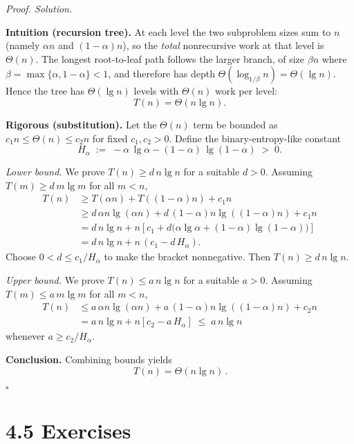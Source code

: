 \documentclass[12pt]{article}
\theoremstyle{definition}
\begin{document}
\medskip
\noindent\textit{Proof. Solution.}

\noindent\textbf{Intuition (recursion tree).}
At each level the two subproblem sizes sum to $n$ (namely $\alpha n$ and $(1-\alpha)n$),
so the \emph{total} nonrecursive work at that level is $\Theta(n)$.
The longest root-to-leaf path follows the larger branch, of size
$\beta n$ where $\beta=\max\{\alpha,1-\alpha\}<1$, and therefore has depth
$\Theta(\log_{1/\beta} n)=\Theta(\lg n)$. 
Hence the tree has $\Theta(\lg n)$ levels with $\Theta(n)$ work per level:
\[
T(n)=\Theta(n\lg n).
\]

\noindent\textbf{Rigorous (substitution).}
Let the $\Theta(n)$ term be bounded as $c_1 n\le \Theta(n)\le c_2 n$ for fixed $c_1,c_2>0$.
Define the binary-entropy-like constant
\[
H_\alpha \;:=\; -\alpha\,\lg \alpha - (1-\alpha)\,\lg(1-\alpha)\;>\;0.
\]

\emph{Lower bound.} We prove $T(n)\ge d\,n\lg n$ for a suitable $d>0$.
Assuming $T(m)\ge d\,m\lg m$ for all $m<n$,
\[
\begin{aligned}
T(n)
&\ge T(\alpha n)+T((1-\alpha)n)+c_1 n\\
&\ge d\,\alpha n\lg(\alpha n)+d\,(1-\alpha)n\lg((1-\alpha)n)+c_1 n\\
&= d\,n\lg n + n\!\left[c_1 + d\big(\alpha\lg\alpha+(1-\alpha)\lg(1-\alpha)\big)\right]\\
&= d\,n\lg n + n\,(c_1 - d\,H_\alpha).
\end{aligned}
\]
Choose $0<d\le c_1/H_\alpha$ to make the bracket nonnegative. Then $T(n)\ge d\,n\lg n$.

\emph{Upper bound.} We prove $T(n)\le a\,n\lg n$ for a suitable $a>0$.
Assuming $T(m)\le a\,m\lg m$ for all $m<n$,
\[
\begin{aligned}
T(n)
&\le a\,\alpha n\lg(\alpha n)+a\,(1-\alpha)n\lg((1-\alpha)n)+c_2 n\\
&= a\,n\lg n + n\!\left[c_2 - a\,H_\alpha\right]
\;\le\; a\,n\lg n
\end{aligned}
\]
whenever $a\ge c_2/H_\alpha$.

\textbf{Conclusion.}
Combining bounds yields
\[
\boxed{\,T(n)=\Theta(n\lg n)\,}.
\]

\hfill$\square$

\newpage

\dotfill
\section*{4.5 Exercises}
\dotfill

\newpage
\end{document}
